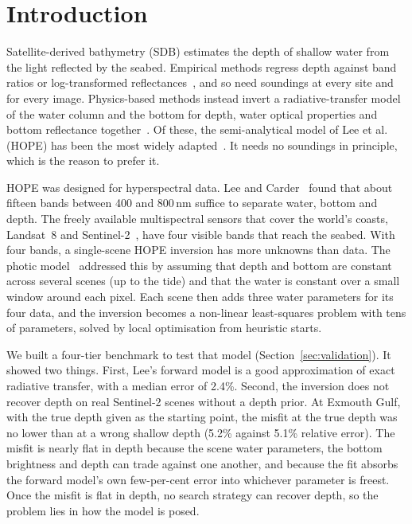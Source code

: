 \documentclass[remotesensing,article,submit,pdftex]{Definitions/mdpi}
\begin{document}
\section{Introduction}

Satellite-derived bathymetry (SDB) estimates the depth of shallow water from the light reflected by the seabed. Empirical methods regress depth against band ratios or log-transformed reflectances~\cite{lyzenga1978,lyzenga2006,stumpf2003,caballero2019}, and so need soundings at every site and for every image. Physics-based methods instead invert a radiative-transfer model of the water column and the bottom for depth, water optical properties and bottom reflectance together~\cite{lee1998,lee1999,lee2001,mobley2005,brando2009,dekker2011}. Of these, the semi-analytical model of Lee et al.~\cite{lee1998,lee1999} (HOPE) has been the most widely adapted~\cite{wettle2006,klonowski2007,hedley2009,hedley2018}. It needs no soundings in principle, which is the reason to prefer it.

HOPE was designed for hyperspectral data. Lee and Carder~\cite{lee2002bands} found that about fifteen bands between 400 and 800\,nm suffice to separate water, bottom and depth. The freely available multispectral sensors that cover the world's coasts, Landsat~8 and Sentinel-2~\cite{drusch2012}, have four visible bands that reach the seabed. With four bands, a single-scene HOPE inversion has more unknowns than data. The photic model~\cite{blake2020} addressed this by assuming that depth and bottom are constant across several scenes (up to the tide) and that the water is constant over a small window around each pixel. Each scene then adds three water parameters for its four data, and the inversion becomes a non-linear least-squares problem with tens of parameters, solved by local optimisation from heuristic starts.

We built a four-tier benchmark to test that model (Section~\ref{sec:validation}). It showed two things. First, Lee's forward model is a good approximation of exact radiative transfer, with a median error of 2.4\%. Second, the inversion does not recover depth on real Sentinel-2 scenes without a depth prior. At Exmouth Gulf, with the true depth given as the starting point, the misfit at the true depth was no lower than at a wrong shallow depth (5.2\% against 5.1\% relative error). The misfit is nearly flat in depth because the scene water parameters, the bottom brightness and depth can trade against one another, and because the fit absorbs the forward model's own few-per-cent error into whichever parameter is freest. Once the misfit is flat in depth, no search strategy can recover depth, so the problem lies in how the model is posed.
\end{document}

